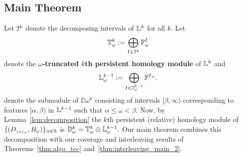 
%

\subsection*{Main Theorem}

Let $\mathcal{I}^k$ denote the decomposing intervals of $\mathbb{L}^k$ for all $k$.
Let
\[\mathbb{T}_\omega^k := \bigoplus_{I\in\mathcal{I}^k} \mathbb{F}_\omega^I\]
denote the \textbf{$\omega$-truncated $k$th persistent homology module} of $\mathbb{L}^k$ and
\[ \mathbb{L}_\omega^{k-1} := \bigoplus_{I\in \mathcal{I}_\omega^{k-1}} \mathbb{F}^{I_+}.\]
denote the submodule of $\DD{\omega}^k$ consisting of intervals $[\beta,\infty)$ corresponding to features $[\alpha,\beta)$ in $\mathbb{L}^{k-1}$ such that $\alpha\leq\omega <\beta$.
Now, by Lemma~\ref{lem:decomposition} the $k$th persistent (relative) homology module of $\{(D_{\scriptscriptstyle \lfloor\alpha\rfloor_{\omega}}, B_\omega)\}_{\alpha\in\mathbb{R}}$ is $\mathbb{D}_{\omega}^k = \mathbb{T}_\omega^k\oplus \mathbb{L}_\omega^{k-1}.$
Our main theorem combines this decomposition with our coverage and interleaving results of Theorems~\ref{thm:algo_tcc} and~\ref{thm:interleaving_main_2}.%

